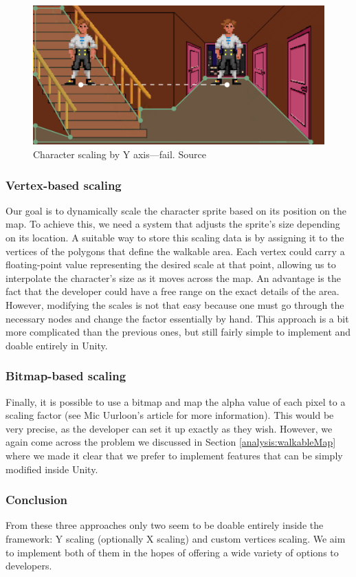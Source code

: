 \begin{figure}[H]
\centering
\includegraphics[width=.75\linewidth]{img/scalef-y.png}
\caption{Character scaling by Y axis—fail. Source \cite{Uurloon3}}
\label{fig:ScaleF}
\end{figure}

\subsubsection{Vertex-based scaling}
Our goal is to dynamically scale the character sprite based on its position on the map. To achieve this, we need a system that adjusts the sprite’s size depending on its location. A suitable way to store this scaling data is by assigning it to the vertices of the polygons that define the walkable area. Each vertex could carry a floating-point value representing the desired scale at that point, allowing us to interpolate the character's size as it moves across the map.  An advantage is the fact that the developer could have a free range on the exact details of the area. However, modifying the scales is not that easy because one must go through the necessary nodes and change the factor essentially by hand. This approach is a bit more complicated than the previous ones, but still fairly simple to implement and doable entirely in Unity.

\subsubsection{Bitmap-based scaling}
Finally, it is possible to use a bitmap and map the alpha value of each pixel to a scaling factor (see Mic Uurloon's article \cite{Uurloon3} for more information). This would be very precise, as the developer can set it up exactly as they wish. However, we again come across the problem we discussed in Section \ref{analysis:walkableMap} where we made it clear that we prefer to implement features that can be simply modified inside Unity.

\subsubsection{Conclusion}
From these three approaches only two seem to be doable entirely inside the framework: Y scaling (optionally X scaling) and custom vertices scaling. We aim to implement both of them in the hopes of offering a wide variety of options to developers.


